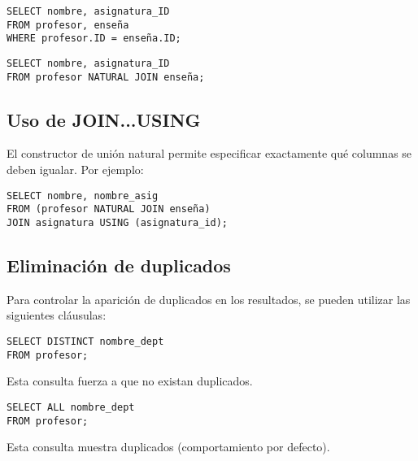 \documentclass{article}
\begin{document}
\begin{verbatim}
SELECT nombre, asignatura_ID 
FROM profesor, enseña 
WHERE profesor.ID = enseña.ID;
\end{verbatim}

\begin{verbatim}
SELECT nombre, asignatura_ID 
FROM profesor NATURAL JOIN enseña;
\end{verbatim}

\subsection{Uso de JOIN...USING}
El constructor de unión natural permite especificar exactamente qué columnas se deben igualar. Por ejemplo:

\begin{verbatim}
SELECT nombre, nombre_asig 
FROM (profesor NATURAL JOIN enseña) 
JOIN asignatura USING (asignatura_id);
\end{verbatim}

\subsection{Eliminación de duplicados}
Para controlar la aparición de duplicados en los resultados, se pueden utilizar las siguientes cláusulas:

\begin{verbatim}
SELECT DISTINCT nombre_dept 
FROM profesor;
\end{verbatim}
Esta consulta fuerza a que no existan duplicados.

\begin{verbatim}
SELECT ALL nombre_dept 
FROM profesor;
\end{verbatim}
Esta consulta muestra duplicados (comportamiento por defecto).
\end{document}

